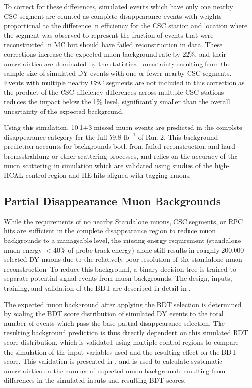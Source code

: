 To correct for these differences, simulated events which have only one nearby CSC segment are counted as complete disappearance events with weights proportional to the difference in efficiency for the CSC station and location where the segment was observed to represent the fraction of events that were reconstructed in MC but should have failed reconstruction in data.
These corrections increase the expected muon background rate by 22$\%$, and their uncertainties are dominated by the statistical uncertainty resulting from the sample size of simulated DY events with one or fewer nearby CSC segments.
Events with multiple nearby CSC segments are not included in this correction as the product of the CSC efficiency differences across multiple CSC stations reduces the impact below the 1$\%$ level, significantly smaller than the overall uncertainty of the expected background.

Using this simulation, 10.1$\pm$3 missed muon events are predicted in the complete disappearance category for the full 59.8 $\mathrm{fb}^{-1}$ of Run 2. 
This background prediction accounts for backgrounds both from failed reconstruction and hard bremsstrahlung or other scattering processes, and relies on the accuracy of the muon scattering in simulation which are validated using studies of the high-HCAL control region and HE hits aligned with tagging muons.

\newpage
\subsection{Partial Disappearance Muon Backgrounds}
While the requirements of no nearby Standalone muons, CSC segments, or RPC hits are sufficient in the complete disappearance region to reduce muon backgrounds to a manageable level, the missing energy requirement (standalone muon energy $<$40$\%$ of probe track energy) alone still results in roughly 200,000 selected DY muons due to the relatively poor resolution of the standalone muon reconstruction.
To reduce this background, a binary decision tree is trained to separate potential signal events from muon backgrounds. 
The design, inputs, training, and validation of the BDT are described in detail in .

The expected muon background after applying the BDT selection is determined by scaling the BDT score distribution of simulated DY events to the total number of events which pass the base partial disappearance selection.
The resulting background prediction is thus directly dependent on this simulated BDT score distribution, which is validated using multiple control regions to compare the simulation of the input variables used and the resulting effect on the BDT score.
This validation is presented in , and is used to calculate systematic uncertainties on the number of expected muon backgrounds resulting from differences in the simulated inputs and resulting BDT scores.

